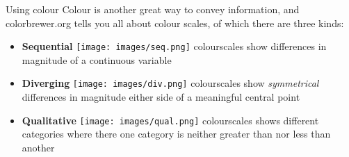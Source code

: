 \documentclass[
  10pt,
  ignorenonframetext,
  aspectratio=169]{beamer}
\begin{document}
\begin{frame}{Using colour}
\protect\hypertarget{using-colour}{}
Colour is another great way to convey information, and colorbrewer.org
tells you all about colour scales, of which there are three kinds:

\begin{itemize}
  \item<2->\textbf{Sequential} \texttt{[image: images/seq.png]} colourscales show differences in magnitude of a continuous variable 
  \item<3->\textbf{Diverging} \texttt{[image: images/div.png]} colourscales show \textit{symmetrical} differences in magnitude either side of a meaningful central point 
  \item<4->\textbf{Qualitative} \texttt{[image: images/qual.png]} colourscales shows different categories where there one category is neither greater than nor less than another 
\end{itemize}

\end{frame}
\end{document}
